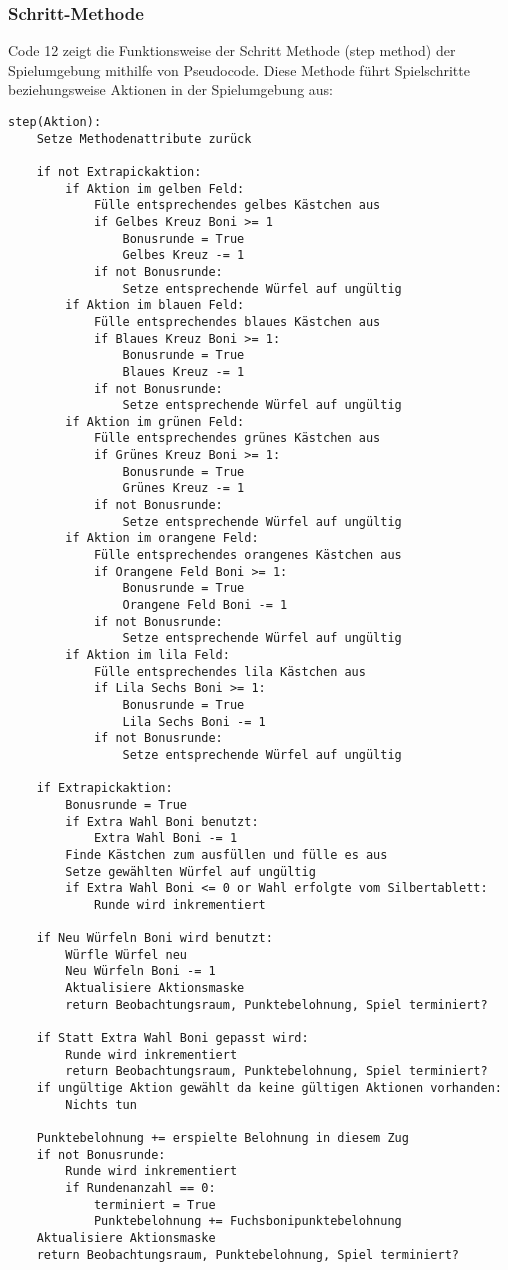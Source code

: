 \subsubsection{Schritt-Methode}
Code 12 zeigt die Funktionsweise der Schritt Methode (step method) der Spielumgebung mithilfe von Pseudocode. Diese Methode führt Spielschritte beziehungsweise Aktionen in der Spielumgebung aus:
\vspace{0.5cm}
\begin{lstlisting}[caption={Schritt-Methode}]
step(Aktion):
	Setze Methodenattribute zurück
	
	if not Extrapickaktion:
		if Aktion im gelben Feld:
			Fülle entsprechendes gelbes Kästchen aus
			if Gelbes Kreuz Boni >= 1
				Bonusrunde = True
				Gelbes Kreuz -= 1
			if not Bonusrunde:
				Setze entsprechende Würfel auf ungültig
		if Aktion im blauen Feld:
			Fülle entsprechendes blaues Kästchen aus
			if Blaues Kreuz Boni >= 1:
				Bonusrunde = True
				Blaues Kreuz -= 1
			if not Bonusrunde:
				Setze entsprechende Würfel auf ungültig
		if Aktion im grünen Feld:
			Fülle entsprechendes grünes Kästchen aus
			if Grünes Kreuz Boni >= 1:
				Bonusrunde = True
				Grünes Kreuz -= 1
			if not Bonusrunde:
				Setze entsprechende Würfel auf ungültig
		if Aktion im orangene Feld:
			Fülle entsprechendes orangenes Kästchen aus
			if Orangene Feld Boni >= 1:
				Bonusrunde = True
				Orangene Feld Boni -= 1
			if not Bonusrunde:
				Setze entsprechende Würfel auf ungültig
		if Aktion im lila Feld:
			Fülle entsprechendes lila Kästchen aus
			if Lila Sechs Boni >= 1:
				Bonusrunde = True
				Lila Sechs Boni -= 1
			if not Bonusrunde:
				Setze entsprechende Würfel auf ungültig
	
	if Extrapickaktion:
		Bonusrunde = True
		if Extra Wahl Boni benutzt:
			Extra Wahl Boni -= 1
		Finde Kästchen zum ausfüllen und fülle es aus
		Setze gewählten Würfel auf ungültig
		if Extra Wahl Boni <= 0 or Wahl erfolgte vom Silbertablett:
			Runde wird inkrementiert
			
	if Neu Würfeln Boni wird benutzt:
		Würfle Würfel neu
		Neu Würfeln Boni -= 1
		Aktualisiere Aktionsmaske
		return Beobachtungsraum, Punktebelohnung, Spiel terminiert?
		
	if Statt Extra Wahl Boni gepasst wird:
		Runde wird inkrementiert
		return Beobachtungsraum, Punktebelohnung, Spiel terminiert?
	if ungültige Aktion gewählt da keine gültigen Aktionen vorhanden:
		Nichts tun
			
	Punktebelohnung += erspielte Belohnung in diesem Zug
	if not Bonusrunde:
		Runde wird inkrementiert
		if Rundenanzahl == 0:
			terminiert = True
			Punktebelohnung += Fuchsbonipunktebelohnung
	Aktualisiere Aktionsmaske
	return Beobachtungsraum, Punktebelohnung, Spiel terminiert?		
\end{lstlisting}
